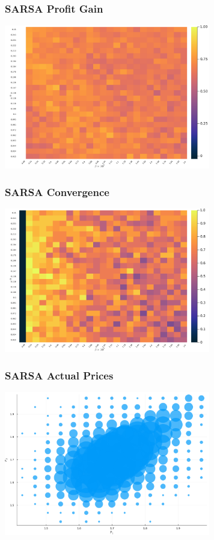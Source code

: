 \documentclass{beamer}
\begin{document}
	
	\begin{frame}\frametitle{SARSA Profit Gain}
\begin{center}
	\includegraphics[width=9cm]{heatmap_profit_gain_small_sarsa.png}
\end{center}
\end{frame}
\begin{frame}\frametitle{SARSA Convergence}
\begin{center}
	\includegraphics[width=9cm]{heatmap_convergence_counts_small_sarsa.png}
\end{center}
\end{frame}
\begin{frame}\frametitle{SARSA Actual Prices}
\begin{center}
	\includegraphics[width=9cm]{scatter_plot_prices_small_sarsa.png}
\end{center}
\end{frame}
\end{document}
